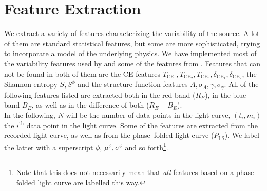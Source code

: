 
\section{Feature Extraction}
\label{sec:feature-extraction}

We extract a variety of features characterizing the variability of the source. A lot of them are standard statistical features, but some are more sophisticated, trying to incorporate a model of the underlying physics. We have implemented most of the variability features used by \citet{kim2014} and some of the features from \citet{dubath2011}. Features that can not be found in both of them are the CE features $T_{\text{CE}_1}, T_{\text{CE}_2}, T_{\text{CE}_3}, \delta_{\text{CE}_1}, \delta_{\text{CE}_2}$, the Shannon entropy $S, S^\phi$ and the structure function features $A, \sigma_A, \gamma, \sigma_\gamma$. All of the following features listed are extracted both in the red band ($R_E$), in the blue band $B_E$, as well as in the difference of both ($R_E - B_E$).\\

In the following, $N$ will be the number of data points in the light curve, $(t_i, m_i)$ the $i^{\text{th}}$ data point in the light curve. Some of the features are extracted from the recorded light curve, as well as from the phase--folded light curve ($P_{\text{LS}}$). We label the latter with a superscript $\phi$, \eg $\mu^\phi, \sigma^\phi$ and so forth\footnote{Note that this does not necessarily mean that \emph{all} features based on a phase--folded light curve are labelled this way.}.

